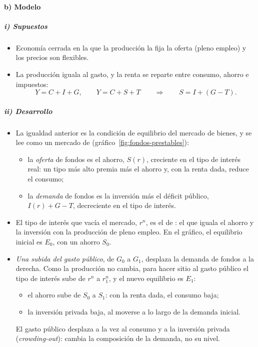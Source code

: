 \documentclass[11pt]{article}
\begin{document}
\paragraph{b) Modelo}

\subparagraph{i) Supuestos}

\begin{itemize}
\item Economía cerrada en la que la producción la fija la oferta (pleno empleo) y los precios son flexibles.
\item La producción iguala al gasto, y la renta se reparte entre consumo, ahorro e impuestos:
  \begin{equation*}
  Y=C+I+G,\qquad Y=C+S+T\qquad\Longrightarrow\qquad S=I+(G-T).
  \end{equation*}
\end{itemize}

\subparagraph{ii) Desarrollo}

\begin{itemize}
\item La igualdad anterior es la condición de equilibrio del mercado de bienes, y se lee como un mercado de  (gráfico~\ref{fig:fondos-prestables}):
  \begin{itemize}
  \item la \emph{oferta} de fondos es el ahorro, $S(r)$, creciente en el tipo de interés real: un tipo más alto premia más el ahorro y, con la renta dada, reduce el consumo;
  \item la \emph{demanda} de fondos es la inversión más el déficit público, $I(r)+G-T$, decreciente en el tipo de interés.
  \end{itemize}
\item El tipo de interés que vacía el mercado, $r^n$, es el  de : el que iguala el ahorro y la inversión con la producción de pleno empleo. En el gráfico, el equilibrio inicial es $E_0$, con un ahorro $S_0$.
\item \emph{Una subida del gasto público}, de $G_0$ a $G_1$, desplaza la demanda de fondos a la derecha. Como la producción no cambia, para hacer sitio al gasto público el tipo de interés sube de $r^n$ a $r^n_1$, y el nuevo equilibrio es $E_1$:
  \begin{itemize}
  \item el ahorro sube de $S_0$ a $S_1$: con la renta dada, el consumo baja;
  \item la inversión privada baja, al moverse a lo largo de la demanda inicial.
  \end{itemize}
  El gasto público desplaza a la vez al consumo y a la inversión privada (\emph{crowding-out}): cambia la composición de la demanda, no su nivel.
\end{itemize}
\end{document}
